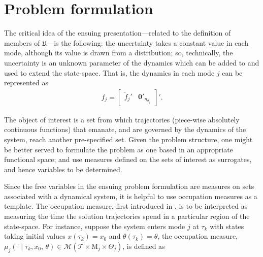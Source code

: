 \section{Problem formulation}
\label{sec:prob}
The critical idea of the ensuing presentation---related to the definition of members of $\mathfrak U$---is the following: the uncertainty takes a constant value in each mode, although its value is drawn from a distribution; so, technically, the uncertainty is an unknown parameter of the dynamics which can be added to and used to extend the state-space. That is, the dynamics in each mode $j$ can be represented as
\begin{align}
f_j=\begin{bmatrix}
  \tilde f_j'&\mathbf{0}'_{n_{\theta_j}}
\end{bmatrix}'.
\end{align}
\par
The object of interest is a set from which trajectories (piece-wise absolutely continuous functions) that emanate, and are governed by the dynamics of the system, reach another pre-specified set. Given the problem structure, one might be better served to formulate the problem as one based in an appropriate functional space; and use measures defined on the sets of interest as surrogates, and hence variables to be determined.
\par
Since the free variables in the ensuing problem formulation are measures on sets associated with a dynamical system, it is helpful to use occupation measures as a template. The occupation measure, first introduced in \cite{Pitman1977}, is to be interpreted as measuring the time the solution trajectories spend in a particular region of the state-space. For instance, suppose the system enters mode $j$ at $\tau_k$ with states taking initial values $x(\tau_k)=x_0$ and $\theta(\tau_k)=\theta$, the occupation measure, \mbox{$\mu_j(\cdot\mid \tau_k,x_0,\,\theta)\in \mathcal M(\mathcal T\times \mathrm M_j\times \Theta_j)$}, is defined as

